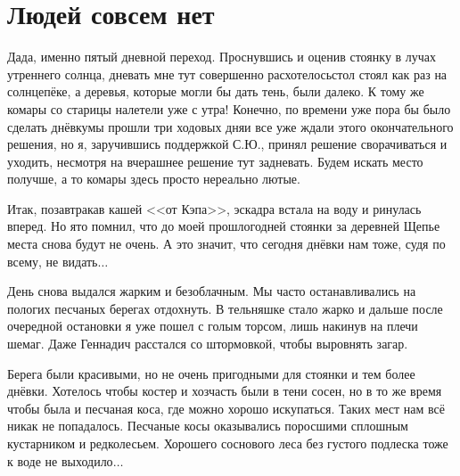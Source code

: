 \chapter{Людей совсем нет} 

Да\sdash да, именно пятый дневной переход. Проснувшись и оценив стоянку в лучах утреннего солнца, дневать мне тут совершенно расхотелось\mdash стол стоял как раз на солнцепёке, а деревья, которые могли бы дать тень, были далеко. К тому же комары со старицы налетели уже с утра! Конечно, по времени уже пора бы было сделать днёвку\mdash мы прошли три ходовых дня\mdash и все уже ждали этого окончательного решения, но я, заручившись поддержкой С.Ю., принял решение сворачиваться и уходить, несмотря на вчерашнее решение тут задневать. Будем искать место получше, а то комары здесь просто нереально лютые.

Итак, позавтракав кашей <<от Кэпа>>, эскадра встала на воду и ринулась вперед. Но я\sdash то помнил, что до моей прошлогодней стоянки за деревней Щепье места снова будут не очень. А это значит, что сегодня днёвки нам тоже, судя по всему, не видать$\ldots$ 

День снова выдался жарким и безоблачным. Мы часто останавливались на пологих песчаных берегах отдохнуть. В тельняшке стало жарко и дальше после очередной остановки я уже пошел с голым торсом, лишь накинув на плечи шемаг. Даже Геннадич расстался со штормовкой, чтобы выровнять загар. 

Берега были красивыми, но не очень пригодными для стоянки и тем более днёвки. Хотелось чтобы костер и хозчасть были в тени сосен, но в то же время чтобы была и песчаная коса, где можно хорошо искупаться. Таких мест нам всё никак не попадалось. Песчаные косы оказывались поросшими сплошным кустарником и редколесьем. Хорошего соснового леса без густого подлеска тоже к воде не выходило$\ldots$ 

